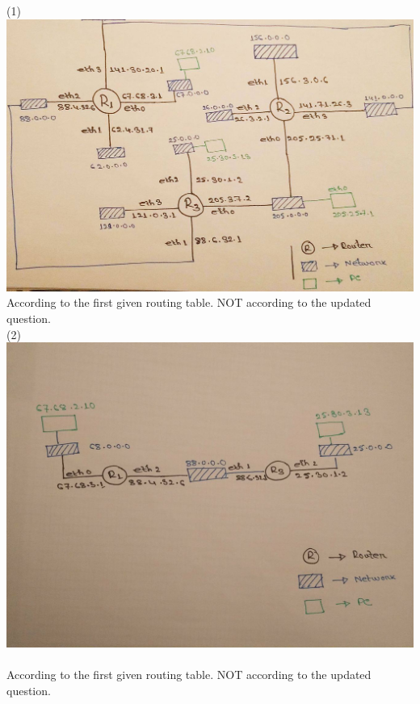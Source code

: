 \documentclass{WeSTassignment}
\begin{document}
(1)\\
\includegraphics[width=1\textwidth]{images/route_table_1.jpg} \\
According to the first given routing table. NOT according to the updated question.\\
(2)\\
\includegraphics[width=1\textwidth]{images/route_table_2.jpg} \\ \\
According to the first given routing table. NOT according to the updated question.\\
\end{document}
